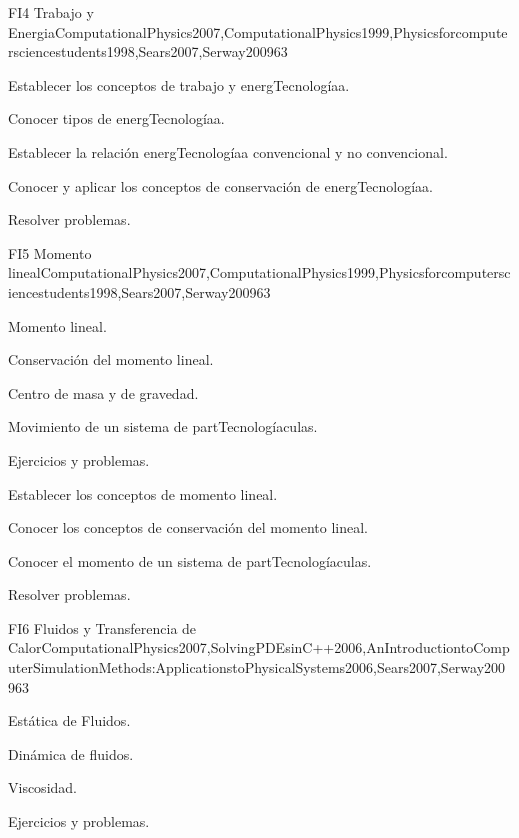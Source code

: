 \begin{syllabus}
\begin{unit}{FI4 Trabajo y Energia}{ComputationalPhysics2007,ComputationalPhysics1999,Physicsforcomputersciencestudents1998,Sears2007,Serway2009}{6}{3}
   \begin{unitgoals}
      \item Establecer los conceptos de trabajo y energTecnologíaa.
      \item Conocer tipos de energTecnologíaa.
      \item Establecer la relación energTecnologíaa convencional y no convencional.
      \item Conocer y aplicar los conceptos de conservación de energTecnologíaa.
      \item Resolver problemas.
   \end{unitgoals}
\end{unit}

\begin{unit}{FI5 Momento lineal}{ComputationalPhysics2007,ComputationalPhysics1999,Physicsforcomputersciencestudents1998,Sears2007,Serway2009}{6}{3}
\begin{topics}
      \item Momento lineal.
      \item Conservación del momento lineal.
      \item Centro de masa y de gravedad.
      \item Movimiento de un sistema de partTecnologíaculas.
      \item Ejercicios y problemas.
  \end{topics}

   \begin{unitgoals}
      \item Establecer los conceptos de momento lineal.
      \item Conocer los conceptos de conservación del momento lineal.
      \item Conocer el momento de un sistema de partTecnologíaculas.
      \item Resolver problemas.
   \end{unitgoals}
\end{unit}

\begin{unit}{FI6 Fluidos y Transferencia de Calor}{ComputationalPhysics2007,SolvingPDEsinC++2006,AnIntroductiontoComputerSimulationMethods:ApplicationstoPhysicalSystems2006,Sears2007,Serway2009}{6}{3}
\begin{topics}
      \item Estática de Fluidos.
      \item Dinámica de fluidos. 
      \item Viscosidad.
      \item Ejercicios y problemas.
  \end{topics}


\end{unit}
\end{syllabus}
